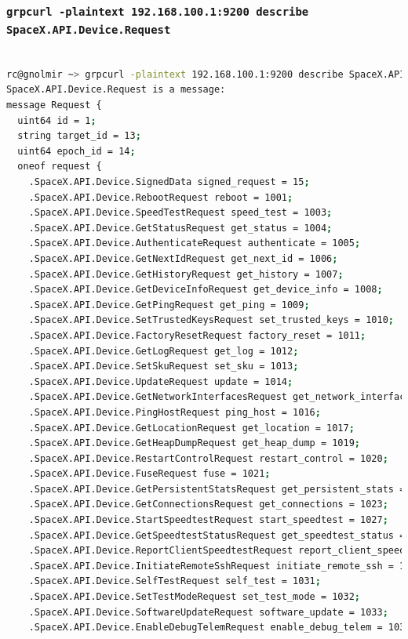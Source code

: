\documentclass[IN,11pt,twoside,openright,bachelor,english]{tumthesis}
\begin{document}
\subsubsection{\texttt{grpcurl -plaintext 192.168.100.1:9200 describe SpaceX.API.Device.Request}}

\begin{lstlisting}[language=bash,basicstyle=\tiny]

rc@gnolmir ~> grpcurl -plaintext 192.168.100.1:9200 describe SpaceX.API.Device.Request
SpaceX.API.Device.Request is a message:
message Request {
  uint64 id = 1;
  string target_id = 13;
  uint64 epoch_id = 14;
  oneof request {
    .SpaceX.API.Device.SignedData signed_request = 15;
    .SpaceX.API.Device.RebootRequest reboot = 1001;
    .SpaceX.API.Device.SpeedTestRequest speed_test = 1003;
    .SpaceX.API.Device.GetStatusRequest get_status = 1004;
    .SpaceX.API.Device.AuthenticateRequest authenticate = 1005;
    .SpaceX.API.Device.GetNextIdRequest get_next_id = 1006;
    .SpaceX.API.Device.GetHistoryRequest get_history = 1007;
    .SpaceX.API.Device.GetDeviceInfoRequest get_device_info = 1008;
    .SpaceX.API.Device.GetPingRequest get_ping = 1009;
    .SpaceX.API.Device.SetTrustedKeysRequest set_trusted_keys = 1010;
    .SpaceX.API.Device.FactoryResetRequest factory_reset = 1011;
    .SpaceX.API.Device.GetLogRequest get_log = 1012;
    .SpaceX.API.Device.SetSkuRequest set_sku = 1013;
    .SpaceX.API.Device.UpdateRequest update = 1014;
    .SpaceX.API.Device.GetNetworkInterfacesRequest get_network_interfaces = 1015;
    .SpaceX.API.Device.PingHostRequest ping_host = 1016;
    .SpaceX.API.Device.GetLocationRequest get_location = 1017;
    .SpaceX.API.Device.GetHeapDumpRequest get_heap_dump = 1019;
    .SpaceX.API.Device.RestartControlRequest restart_control = 1020;
    .SpaceX.API.Device.FuseRequest fuse = 1021;
    .SpaceX.API.Device.GetPersistentStatsRequest get_persistent_stats = 1022;
    .SpaceX.API.Device.GetConnectionsRequest get_connections = 1023;
    .SpaceX.API.Device.StartSpeedtestRequest start_speedtest = 1027;
    .SpaceX.API.Device.GetSpeedtestStatusRequest get_speedtest_status = 1028;
    .SpaceX.API.Device.ReportClientSpeedtestRequest report_client_speedtest = 1029;
    .SpaceX.API.Device.InitiateRemoteSshRequest initiate_remote_ssh = 1030 [deprecated = true];
    .SpaceX.API.Device.SelfTestRequest self_test = 1031;
    .SpaceX.API.Device.SetTestModeRequest set_test_mode = 1032;
    .SpaceX.API.Device.SoftwareUpdateRequest software_update = 1033;
    .SpaceX.API.Device.EnableDebugTelemRequest enable_debug_telem = 1034;

\end{lstlisting}
\end{document}
